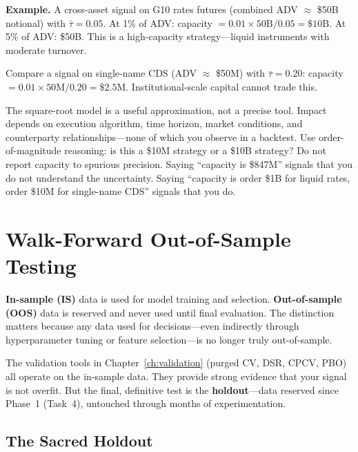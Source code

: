 \textbf{Example.}  A cross-asset signal on G10 rates futures (combined ADV $\approx$ \$50B notional) with $\bar{\tau} = 0.05$.  At 1\% of ADV: capacity $= 0.01 \times 50\text{B} / 0.05 = \$10\text{B}$.  At 5\% of ADV: \$50B.  This is a high-capacity strategy---liquid instruments with moderate turnover.

Compare a signal on single-name CDS (ADV $\approx$ \$50M) with $\bar{\tau} = 0.20$: capacity $= 0.01 \times 50\text{M} / 0.20 = \$2.5\text{M}$.  Institutional-scale capital cannot trade this.

\begin{warning}
The square-root model is a useful approximation, not a precise tool.  Impact depends on execution algorithm, time horizon, market conditions, and counterparty relationships---none of which you observe in a backtest.  Use order-of-magnitude reasoning: is this a \$10M strategy or a \$10B strategy?  Do not report capacity to spurious precision.  Saying ``capacity is \$847M'' signals that you do not understand the uncertainty.  Saying ``capacity is order \$1B for liquid rates, order \$10M for single-name CDS'' signals that you do.
\end{warning}


\section{Walk-Forward Out-of-Sample Testing}
\label{sec:walk-forward}

\begin{prereq}
\textbf{In-sample (IS)} data is used for model training and selection.  \textbf{Out-of-sample (OOS)} data is reserved and never used until final evaluation.  The distinction matters because any data used for decisions---even indirectly through hyperparameter tuning or feature selection---is no longer truly out-of-sample.
\end{prereq}

The validation tools in Chapter~\ref{ch:validation} (purged CV, DSR, CPCV, PBO) all operate on the in-sample data.  They provide strong evidence that your signal is not overfit.  But the final, definitive test is the \textbf{holdout}---data reserved since Phase~1 (Task~4), untouched through months of experimentation.

\subsection{The Sacred Holdout}


